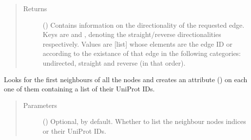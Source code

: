 \documentclass[letterpaper,10pt,english]{sphinxmanual}
\begin{document}
\begin{fulllineitems}
\begin{fulllineitems}
\begin{quote}
\begin{description}
\begin{itemize}
\end{itemize}

\item[{Returns}] \leavevmode
() \textendash{} Contains information on the directionality of
the requested edge. Keys are  and , denoting
the straight/reverse directionalities respectively. Values
are {[}list{]} whose elements are the edge ID or 
according to the existance of that edge in the following
categories: undirected, straight and reverse (in that
order).

\end{description}\end{quote}

\end{fulllineitems}


\begin{fulllineitems}
\label{\detokenize{reference:pypath.main.PyPath.all_neighbours}}
Looks for the first neighbours of all the nodes and creates an
attribute () on each one of them containing a
list of their UniProt IDs.
\begin{quote}\begin{description}
\item[{Parameters}] \leavevmode
{} () \textendash{} Optional,  by default. Whether to list the
neighbour nodes indices or their UniProt IDs.

\end{description}\end{quote}

\end{fulllineitems}



\end{fulllineitems}
\end{document}
